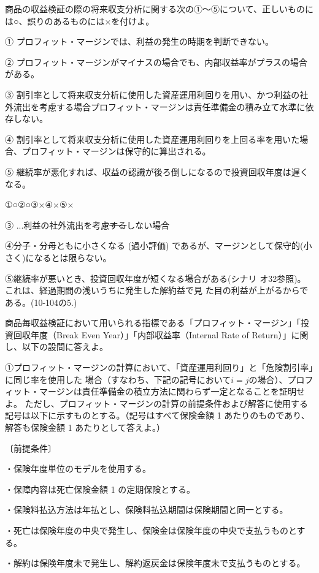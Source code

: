 \documentclass[report,gutter=10mm,fore-edge=10mm,uplatex,dvipdfmx]{jlreq}
\begin{document}
商品の収益検証の際の将来収支分析に関する次の①～⑤について、正しいものには○、誤りのあるものには×を付けよ。

① プロフィット・マージンでは、利益の発生の時期を判断できない。

② プロフィット・マージンがマイナスの場合でも、内部収益率がプラスの場合がある。

③ 割引率として将来収支分析に使用した資産運用利回りを用い、かつ利益の社外流出を考慮する場合プロフィット・マージンは責任準備金の積み立て水準に依存しない。

④ 割引率として将来収支分析に使用した資産運用利回りを上回る率を用いた場合、プロフィット・マージンは保守的に算出される。

⑤ 継続率が悪化すれば、収益の認識が後ろ倒しになるので投資回収年度は遅くなる。

\answer{}
①○②○③×④×⑤×

③ ...利益の社外流出を考慮\sout{する}しない場合

④分子・分母ともに小さくなる (過小評価) であるが、マージンとして保守的(小さく)になるとは限らない。

⑤継続率が悪いとき、投資回収年度が短くなる場合がある(シナリ
オ32参照)。これは、経過期間の浅いうちに発生した解約益で見
た目の利益が上がるからである。(10-104の5.)

商品毎収益検証において用いられる指標である「プロフィット・マージン」「投資回収年度（Break
Even Year）」「内部収益率（Internal Rate of Return）」に関し、以下の設問に答えよ。

①プロフィット・マージンの計算において、「資産運用利回り」と「危険割引率」に同じ率を使用した
場合（すなわち、下記の記号において$i=j$の場合）、プロフィット・マージンは責任準備金の積立方法に関わらず一定となることを証明せよ。
ただし、プロフィット・マージンの計算の前提条件および解答に使用する記号は以下に示すものとする。（記号はすべて保険金額 1 あたりのものであり、解答も保険金額 1 あたりとして答えよ。）

〔前提条件〕

・保険年度単位のモデルを使用する。

・保障内容は死亡保険金額 1 の定期保険とする。

・保険料払込方法は年払とし、保険料払込期間は保険期間と同一とする。

・死亡は保険年度の中央で発生し、保険金は保険年度の中央で支払うものとする。

・解約は保険年度未で発生し、解約返戻金は保険年度未で支払うものとする。
\end{document}
